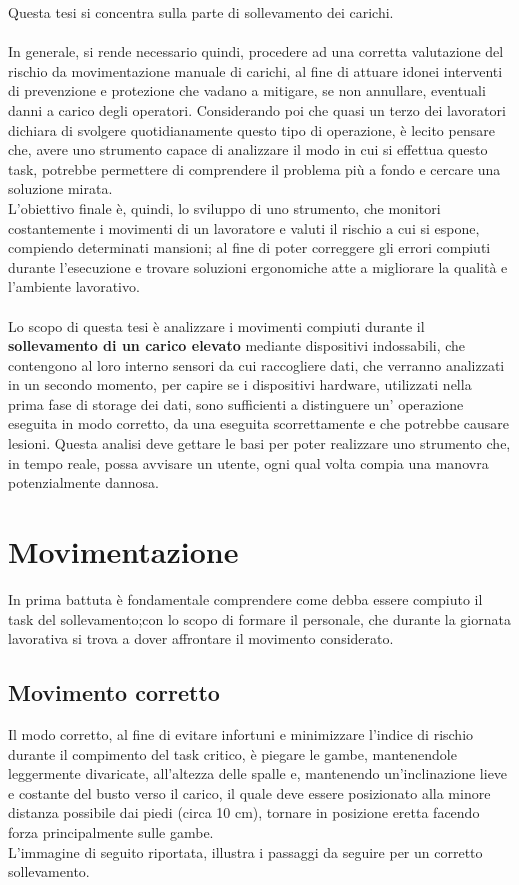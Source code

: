 \documentclass[a4paper]{article}
\begin{document}
Questa tesi si concentra sulla parte di sollevamento dei carichi. \\ \\
In generale, si rende necessario quindi, procedere ad una corretta valutazione del rischio da movimentazione manuale di carichi, al fine di attuare idonei interventi di prevenzione e protezione che vadano a mitigare, se non annullare, eventuali danni a carico degli operatori. Considerando poi che quasi un terzo dei lavoratori dichiara di svolgere quotidianamente questo tipo di operazione, è lecito pensare che, avere uno strumento capace di analizzare il modo in cui si effettua questo task, potrebbe permettere di comprendere il problema più a fondo e cercare una soluzione mirata.\\
L'obiettivo finale è, quindi, lo sviluppo di uno strumento, che monitori costantemente i movimenti di un lavoratore e valuti il rischio a cui si espone, compiendo determinati mansioni; al fine di poter correggere gli errori compiuti durante l'esecuzione e trovare soluzioni ergonomiche atte a migliorare la qualità e l'ambiente lavorativo.\\ \\
Lo scopo di questa tesi è analizzare i movimenti compiuti durante il \textbf{sollevamento di un carico elevato} mediante dispositivi indossabili, che contengono al loro interno sensori da cui raccogliere dati, che verranno analizzati in un secondo momento, per capire se i dispositivi hardware, utilizzati nella prima fase di storage dei dati, sono sufficienti a distinguere un' operazione eseguita in modo corretto, da una eseguita scorrettamente e che potrebbe causare lesioni. Questa analisi deve gettare le basi per poter realizzare uno strumento che, in tempo reale, possa avvisare un utente, ogni qual volta compia una manovra potenzialmente dannosa.


	\clearpage

	\section{Movimentazione}

In prima battuta è fondamentale comprendere come debba essere compiuto il task del sollevamento;con lo scopo di formare il personale, che durante la giornata lavorativa si trova a dover affrontare il movimento considerato. 
	\subsection{Movimento corretto}
Il modo corretto, al fine di evitare infortuni e minimizzare l'indice di rischio durante il compimento del task critico, è piegare le gambe, mantenendole leggermente divaricate, all'altezza delle spalle e, mantenendo un’inclinazione lieve e costante del busto verso il carico, il quale deve essere posizionato alla minore distanza possibile dai piedi (circa 10 cm), tornare in posizione eretta facendo forza principalmente sulle gambe. \\ L'immagine di seguito riportata, illustra i passaggi da seguire per un corretto sollevamento.\\
\end{document}
